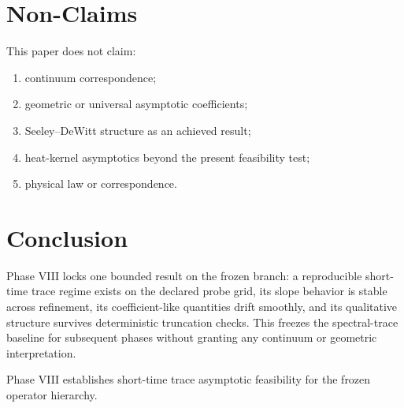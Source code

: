 \documentclass[11pt]{article}
\begin{document}
\section{Non-Claims}

This paper does not claim:
\begin{enumerate}
\item continuum correspondence;
\item geometric or universal asymptotic coefficients;
\item Seeley--DeWitt structure as an achieved result;
\item heat-kernel asymptotics beyond the present feasibility test;
\item physical law or correspondence.
\end{enumerate}

\section{Conclusion}

Phase VIII locks one bounded result on the frozen branch: a reproducible short-time trace regime exists on the declared probe grid, its slope behavior is stable across refinement, its coefficient-like quantities drift smoothly, and its qualitative structure survives deterministic truncation checks. This freezes the spectral-trace baseline for subsequent phases without granting any continuum or geometric interpretation.

Phase VIII establishes short-time trace asymptotic feasibility for the frozen operator hierarchy.
\end{document}
